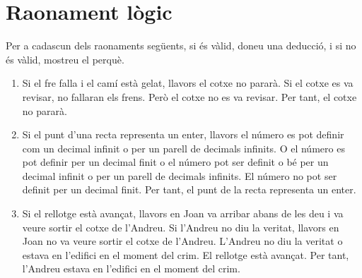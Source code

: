 \section{Raonament lògic}

\begin{exercici}
Per a cadascun dels raonaments següents, si és vàlid, doneu una
deducció, i si no és vàlid, mostreu el perquè.

\begin{enumerate}
\item Si el fre falla i el camí està gelat, llavors el cotxe no
pararà. Si el cotxe es va revisar, no fallaran els frens. Però el
cotxe no es va revisar. Per tant, el cotxe no pararà.

\item Si el punt d'una recta representa un enter, llavors el número es pot
definir com un decimal infinit o per un parell de decimals infinits. O el
número es pot definir per un decimal finit o el número pot ser definit
o bé per un decimal infinit o per un parell de decimals infinits. El
número no pot ser definit per un decimal finit. Per tant, el punt de la
recta representa un enter.

\item Si el rellotge està avançat, llavors en Joan va arribar abans de
les deu i va veure sortir el cotxe de l'Andreu. Si l'Andreu no diu la veritat,
llavors en Joan no va veure sortir el cotxe de l'Andreu. L'Andreu no diu la
veritat o estava en l'edifici en el moment del crim. El rellotge està
avançat. Per tant, l'Andreu estava en l'edifici en el moment del crim.
\end{enumerate}
\end{exercici}

